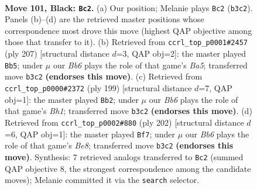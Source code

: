 \documentclass[11pt]{article}
\begin{document}
\clearpage

\begin{figure}[p]\centering
\begin{subfigure}{0.46\textwidth}\centering
\resizebox{\linewidth}{!}{%
\newchessgame
\chessboard[
  setfen={8/5k1K/8/5p2/5P2/1b6/8/8 b - - 17 101},
  showmover=false,
  pgfstyle=straightmove, color=movearrow, markmove={b3-c2}
]}
\caption{}
\end{subfigure}\hfill
\begin{subfigure}{0.46\textwidth}\centering
\resizebox{\linewidth}{!}{%
\newchessgame
\chessboard[
  setfen={4k3/8/p7/P7/b7/8/3K3B/8 b - - 15 104},
  showmover=false,
  pgfstyle=straightmove, color=movearrow, markmove={a4-b5}
]}
\caption{}
\end{subfigure}
\\[4pt]
\begin{subfigure}{0.46\textwidth}\centering
\resizebox{\linewidth}{!}{%
\newchessgame
\chessboard[
  setfen={7b/8/8/k7/2K5/p4N2/P7/8 b - - 57 100},
  showmover=false,
  pgfstyle=straightmove, color=movearrow, markmove={h8-b2}
]}
\caption{}
\end{subfigure}\hfill
\begin{subfigure}{0.46\textwidth}\centering
\resizebox{\linewidth}{!}{%
\newchessgame
\chessboard[
  setfen={4B1n1/8/3p4/3P4/1k6/8/2K5/8 w - - 17 102},
  showmover=false,
  pgfstyle=straightmove, color=movearrow, markmove={e8-f7}
]}
\caption{}
\end{subfigure}
\caption{\textbf{Move 101, Black: \texttt{Bc2}.} (a) Our position; Melanie plays \texttt{Bc2} (\texttt{b3c2}). Panels (b)--(d) are the retrieved master positions whose correspondence most drove this move (highest QAP objective among those that transfer to it). (b) Retrieved from \texttt{ccrl\_top\_p0001\#2457} (ply 207) [structural distance $d$=3, QAP obj=2]: the master played \texttt{Bb5}; under $\mu$ our \emph{Bb6} plays the role of that game's \emph{Ba5}; transferred move \texttt{b3c2} \textbf{(endorses this move)}. (c) Retrieved from \texttt{ccrl\_top\_p0000\#2372} (ply 199) [structural distance $d$=7, QAP obj=1]: the master played \texttt{Bb2}; under $\mu$ our \emph{Bb6} plays the role of that game's \emph{Bh1}; transferred move \texttt{b3c2} \textbf{(endorses this move)}. (d) Retrieved from \texttt{ccrl\_top\_p0002\#880} (ply 202) [structural distance $d$=6, QAP obj=1]: the master played \texttt{Bf7}; under $\mu$ our \emph{Bb6} plays the role of that game's \emph{Be8}; transferred move \texttt{b3c2} \textbf{(endorses this move)}. Synthesis: 7 retrieved analogs transferred to \texttt{Bc2} (summed QAP objective 8, the strongest correspondence among the candidate moves); Melanie committed it via the \texttt{search} selector.}
\label{fig:thought-m201}
\end{figure}
\end{document}
